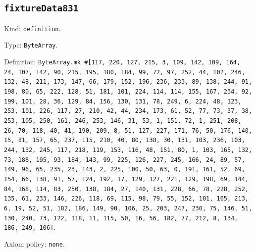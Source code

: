 \documentclass[11pt]{article}
\begin{document}
\subsection*{\texttt{fixtureData831}}
\noindent Kind: \texttt{definition}.\par
\noindent Type: \texttt{ByteArray}.\par
\noindent Definition: \texttt{ByteArray.mk \#[117, 220, 127, 215, 3, 109, 142, 109, 164, 24, 107, 142, 90, 215, 195, 180, 184, 99, 72, 97, 252, 44, 102, 246, 132, 48, 211, 173, 147, 66, 179, 152, 196, 236, 233, 89, 138, 244, 91, 198, 80, 65, 222, 128, 51, 181, 101, 224, 114, 114, 155, 167, 234, 92, 199, 101, 28, 36, 129, 84, 156, 130, 131, 78, 249, 6, 224, 48, 123, 253, 101, 226, 117, 27, 210, 42, 44, 234, 173, 61, 52, 77, 73, 37, 38, 253, 105, 250, 161, 246, 253, 146, 31, 53, 1, 151, 72, 1, 251, 208, 26, 70, 118, 40, 41, 190, 209, 8, 51, 127, 227, 171, 76, 50, 176, 140, 15, 81, 157, 65, 237, 115, 210, 40, 80, 138, 30, 131, 103, 236, 103, 244, 132, 245, 117, 218, 119, 153, 116, 48, 151, 80, 1, 103, 165, 132, 73, 188, 195, 93, 184, 143, 99, 225, 126, 227, 245, 166, 24, 89, 57, 149, 96, 65, 235, 23, 143, 2, 225, 100, 50, 63, 0, 191, 161, 52, 69, 154, 66, 138, 91, 57, 124, 192, 17, 129, 127, 221, 129, 198, 69, 144, 84, 168, 114, 83, 250, 138, 184, 27, 140, 131, 228, 66, 78, 228, 252, 135, 61, 233, 146, 226, 118, 69, 115, 98, 79, 55, 152, 101, 165, 213, 6, 19, 52, 51, 182, 186, 149, 90, 106, 25, 203, 247, 230, 75, 146, 51, 130, 240, 73, 122, 118, 11, 115, 50, 16, 56, 182, 77, 212, 8, 134, 186, 249, 106]}.\par
\noindent Axiom policy: \texttt{none}.\par
\end{document}
